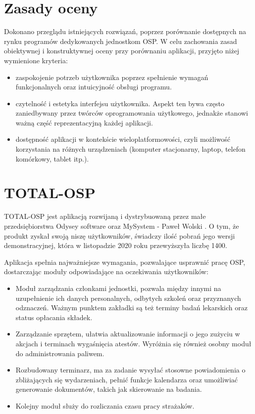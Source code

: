 \section{Zasady oceny}

Dokonano przeglądu istniejących rozwiązań, poprzez porównanie dostępnych na rynku programów dedykowanych jednostkom OSP. W celu zachowania zasad obiektywnej i konstruktywnej oceny przy porównaniu aplikacji, przyjęto niżej wymienione kryteria:

\begin{itemize}
    \item zaspokojenie potrzeb użytkownika poprzez spełnienie wymagań funkcjonalnych oraz  intuicyjność obsługi programu.
    \item czytelność i estetyka interfejsu użytkownika. Aspekt ten bywa często zaniedbywany przez twórców oprogramowania użytkowego, jednakże stanowi ważną część reprezentacyjną każdej aplikacji.
    \item dostępność aplikacji w kontekście wieloplatformowości, czyli możliwość korzystania na różnych urządzeniach (komputer stacjonarny, laptop, telefon komórkowy, tablet itp.).
\end{itemize}

\section{TOTAL-OSP}

TOTAL-OSP jest aplikacją rozwijaną i dystrybuowaną przez małe przedsiębiorstwa Odysey software oraz MySystem - Paweł Wolski \cite{TOTAL-OSP}. O tym, że produkt zyskał swoją niszę użytkowników, świadczy ilość pobrań jego wersji demonstracyjnej, która w listopadzie 2020 roku przewyższyła liczbę 1400.

Aplikacja spełnia najważniejsze wymagania, pozwalające usprawnić pracę OSP, dostarczając moduły odpowiadające na oczekiwania użytkowników: 
\begin{itemize}
    \item Moduł zarządzania członkami jednostki, pozwala między innymi na uzupełnienie ich danych personalnych, odbytych szkoleń oraz przyznanych odznaczeń. Ważnym punktem zakładki są też terminy badań lekarskich oraz status opłacania składek.
    \item Zarządzanie sprzętem, ułatwia aktualizowanie informacji o jego zużyciu w akcjach i terminach wygaśnięcia atestów. Wyróżnia się również osobny moduł do administrowania paliwem.
    \item Rozbudowany terminarz, ma za zadanie wysyłać stosowne powiadomienia o zbliżających się wydarzeniach, pełnić funkcje kalendarza oraz umożliwiać generowanie dokumentów, takich jak skierowanie na badania.
    \item Kolejny moduł służy do rozliczania czasu pracy strażaków.
\end{itemize}

